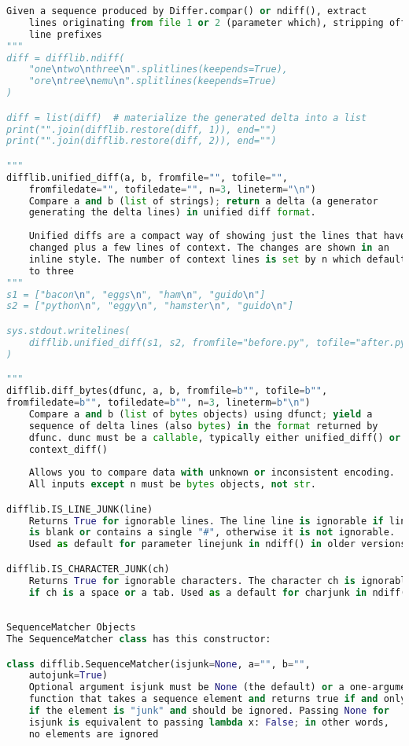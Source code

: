 \documentclass[a4paper,landscape]{report}
\begin{document}
\begin{lstlisting}[language=Python]
    Given a sequence produced by Differ.compar() or ndiff(), extract
    lines originating from file 1 or 2 (parameter which), stripping off
    line prefixes
"""
diff = difflib.ndiff(
    "one\ntwo\nthree\n".splitlines(keepends=True),
    "ore\ntree\nemu\n".splitlines(keepends=True)
)

diff = list(diff)  # materialize the generated delta into a list
print("".join(difflib.restore(diff, 1)), end="")
print("".join(difflib.restore(diff, 2)), end="")

"""
difflib.unified_diff(a, b, fromfile="", tofile="",
    fromfiledate="", tofiledate="", n=3, lineterm="\n")
    Compare a and b (list of strings); return a delta (a generator
    generating the delta lines) in unified diff format.
    
    Unified diffs are a compact way of showing just the lines that have
    changed plus a few lines of context. The changes are shown in an
    inline style. The number of context lines is set by n which defaults
    to three
"""
s1 = ["bacon\n", "eggs\n", "ham\n", "guido\n"]
s2 = ["python\n", "eggy\n", "hamster\n", "guido\n"]

sys.stdout.writelines(
    difflib.unified_diff(s1, s2, fromfile="before.py", tofile="after.py")
)

"""
difflib.diff_bytes(dfunc, a, b, fromfile=b"", tofile=b"",
fromfiledate=b"", tofiledate=b"", n=3, lineterm=b"\n")
    Compare a and b (list of bytes objects) using dfunct; yield a 
    sequence of delta lines (also bytes) in the format returned by
    dfunc. dunc must be a callable, typically either unified_diff() or
    context_diff()
    
    Allows you to compare data with unknown or inconsistent encoding.
    All inputs except n must be bytes objects, not str.

difflib.IS_LINE_JUNK(line)
    Returns True for ignorable lines. The line line is ignorable if line
    is blank or contains a single "#", otherwise it is not ignorable. 
    Used as default for parameter linejunk in ndiff() in older versions

difflib.IS_CHARACTER_JUNK(ch)
    Returns True for ignorable characters. The character ch is ignorable
    if ch is a space or a tab. Used as a default for charjunk in ndiff()
    
    
SequenceMatcher Objects
The SequenceMatcher class has this constructor:

class difflib.SequenceMatcher(isjunk=None, a="", b="",
    autojunk=True)
    Optional argument isjunk must be None (the default) or a one-argument
    function that takes a sequence element and returns true if and only
    if the element is "junk" and should be ignored. Passing None for 
    isjunk is equivalent to passing lambda x: False; in other words,
    no elements are ignored
    

\end{lstlisting}
\end{document}

